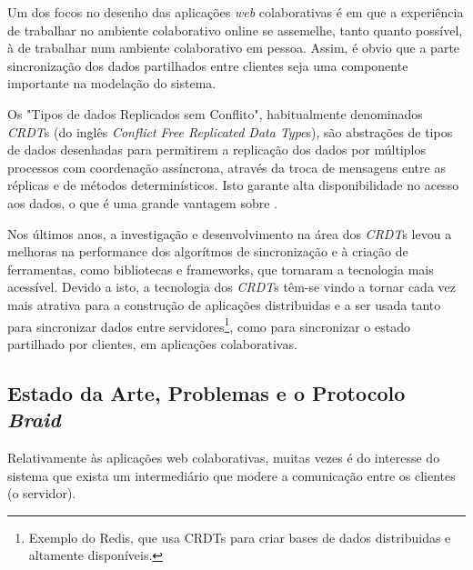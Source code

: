 \documentclass[runningheads]{llncs}
\begin{document}
        Um dos focos no desenho das aplicações {\itshape web} colaborativas é em
        que a experiência de trabalhar no ambiente colaborativo online se
        assemelhe, tanto quanto possível, à de trabalhar num ambiente
        colaborativo em pessoa. Assim, é obvio que a parte sincronização dos
        dados partilhados entre clientes seja uma componente importante na
        modelação do sistema.

        Os "Tipos de dados Replicados sem Conflito", habitualmente denominados
        {\itshape CRDT}s (do inglês {\itshape Conflict Free Replicated Data
        Type}s), são abstrações de tipos de dados desenhadas para permitirem a
        replicação dos dados por múltiplos processos com coordenação assíncrona,
        através da troca de mensagens entre as réplicas e de métodos
        determinísticos\cite{CRDTs}. Isto garante alta disponibilidade no acesso
        aos dados, o que é uma grande vantagem sobre .
        
        Nos últimos anos, a investigação e desenvolvimento na área dos {\itshape
        CRDT}s levou a melhoras na performance dos algorítmos de sincronização e
        à criação de ferramentas, como bibliotecas e frameworks, que tornaram a
        tecnologia mais acessível. Devido a isto, a tecnologia dos {\itshape
        CRDT}s têm-se vindo a tornar cada vez mais atrativa para a construção de
        aplicações distribuidas e a ser usada tanto para sincronizar dados entre
        servidores\footnote{Exemplo do Redis, que usa CRDTs para criar bases de
        dados distribuidas e altamente disponíveis.}, como para sincronizar o
        estado partilhado por clientes, em aplicações colaborativas.

        \subsection{Estado da Arte, Problemas e o Protocolo {\itshape Braid}}

        Relativamente às aplicações web colaborativas, muitas vezes é do
        interesse do sistema que exista um intermediário que modere a
        comunicação entre os clientes (o servidor). 
        
\end{document}
